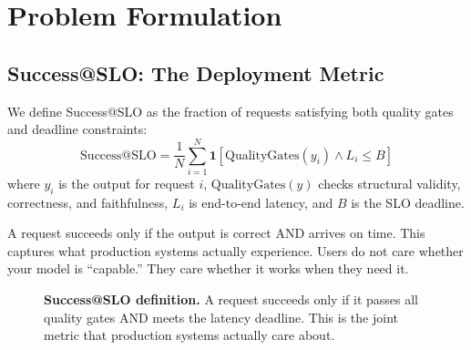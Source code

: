 \documentclass[11pt]{article}
\begin{document}
\section{Problem Formulation}
\label{sec:problem}

\subsection{Success@SLO: The Deployment Metric}

We define Success@SLO as the fraction of requests satisfying both quality gates and deadline constraints:
\begin{equation}
\text{Success@SLO} = \frac{1}{N} \sum_{i=1}^{N} \mathbf{1}\left[\text{QualityGates}(y_i) \land L_i \leq B\right]
\label{eq:success-at-slo}
\end{equation}
where $y_i$ is the output for request $i$, $\text{QualityGates}(y)$ checks structural validity, correctness, and faithfulness, $L_i$ is end-to-end latency, and $B$ is the SLO deadline.

A request succeeds only if the output is correct AND arrives on time.
This captures what production systems actually experience.
Users do not care whether your model is ``capable.''
They care whether it works when they need it.

\begin{figure}[t]
\centering
{}
\caption{\textbf{Success@SLO definition.} A request succeeds only if it passes all quality gates AND meets the latency deadline. This is the joint metric that production systems actually care about.}
\label{fig:success-at-slo}
\end{figure}
\end{document}
